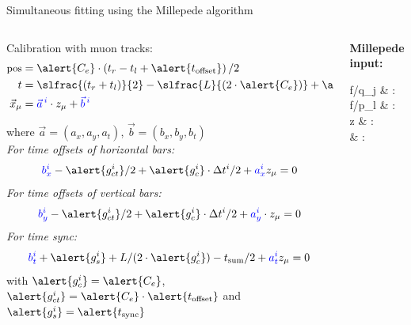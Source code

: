 \documentclass{ikpKoeln}
\begin{document}
\begin{frame}[t]{Simultaneous fitting using the Millepede algorithm}
	\begin{columns}[t]
		\begin{column}{0.48 \textwidth}
			\pause
			Calibration with muon tracks:
			\vspace*{-0.5em}
			\begin{align}
				\small
				\text{pos}  & = \alert{C_e}\cdot \left( t_r - t_l  + \alert{t_\text{offset}} \right) / 2            \\
				t           & = \slfrac{(t_r + t_l)}{2} - \slfrac{L}{(2 \cdot \alert{C_e})} + \alert{t_\text{sync}} \\
				\vec{x}_\mu & = \textcolor{blue}{\vec{a}^{\,i}} \cdot z_\mu  + \textcolor{blue}{\vec{b}^{\,i}}
			\end{align}
			\vspace*{-2em}

			{\scriptsize where $\vec{a} = (a_x, a_y, a_t)$, $\vec{b} = (b_x, b_y, b_t)$}\\

			\pause
			\vspace*{0.5em}
			{\footnotesize
			{\textit{For time offsets of horizontal bars:}}
			\vspace*{-0.5em}
			$$\textcolor{blue}{b^i_x} - \alert{g^i_{ct}} /2 + \alert{g^i_c} \cdot \Delta t^i / 2 + \textcolor{blue}{a^i_x} z_\mu         = 0 $$
			\textit{For time offsets of vertical bars:}
			$$\textcolor{blue}{b^i_y} - \alert{g^i_{ct}} /2 + \alert{g^i_c} \cdot \Delta t^i / 2+ \textcolor{blue}{a^i_y} \cdot z_\mu = 0 $$
			\textit{For time sync:}
			$$\textcolor{blue}{b^i_t}  + \alert{g^i_s} + L / (2 \cdot \alert{g^i_c}) - t_\text{sum} / 2 + \textcolor{blue}{a^i_t} z_\mu  = 0 $$
			\vspace{-2em}
			with $\alert{g^i_{c}} = \alert{C_e}$, $\alert{g^i_{ct}} = \alert{C_e} \cdot \alert{t_\text{offset}}$ and $\alert{g^i_s} = \alert{t_\text{sync}}$
			}
		\end{column}

		\begin{column}{0.48 \textwidth}
			\pause
			\textbf{Millepede input:}
			\vspace*{-0.5em}
			\begin{flalign*}
				\partial f/{\partial q_j} & :  \\
				\partial f/{\partial p_l} & :           \\
				z                         & :                   \\
				\sigma                    & : 
			\end{flalign*}


\end{column}
\end{columns}
\end{frame}
\end{document}
